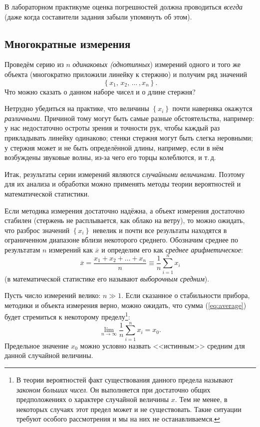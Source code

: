 \documentclass[10pt]{article}
\begin{document}
В лабораторном практикуме оценка погрешностей должна проводиться \emph{всегда}
(даже когда составители задания забыли упомянуть об этом).

\subsection{Многократные измерения}

Проведём серию из $n$ \emph{одинаковых (однотипных}) измерений одного
и того же объекта (многократно приложили линейку к стержню) и получим
ряд значений
\[
\left\{ x_{1},\,x_{2},\,\ldots\,,x_{n}\right\} .
\]
Что можно сказать о данном наборе чисел и о длине стержня?

Нетрудно убедиться на практике, что величины $\left\{ x_{i}\right\} $
почти наверняка окажутся \emph{различными}. Причиной тому могут быть
самые разные обстоятельства, например: у нас недостаточно остроты
зрения и точности рук, чтобы каждый раз прикладывать линейку одинаково;
стенки стержня могут быть слегка неровными; у стержня может и не быть
определённой длины, например, если в нём возбуждены звуковые волны,
из-за чего его торцы колеблются, и т.\,д.

Итак, результаты серии измерений являются \emph{случайными величинами}.
Поэтому для их анализа и обработки можно применять методы теории вероятностей
и математической статистики.

Если методика измерения достаточно надёжна, а объект измерения достаточно
стабилен (стержень не расплывается, как облако на ветру), то можно
ожидать, что разброс значений $\left\{ x_{i}\right\} $ невелик и
почти все результаты находятся в ограниченном диапазоне вблизи некоторого
среднего. Обозначим среднее по результатам $n$ измерений как $\overline{x}$
и определим его как \emph{среднее арифметическое}:
\begin{equation}
\overline{x}=\frac{x_{1}+x_{2}+\ldots+x_{n}}{n}\equiv\frac{1}{n}\sum\limits _{i=1}^{n}x_{i}\label{eq:average}
\end{equation}
(в математической статистике его называют \emph{выборочным средним}).

Пусть число измерений велико: $n\gg1$. Если сказанное о стабильности
прибора, методики и объекта измерения верно, можно ожидать, что сумма
(\ref{eq:average}) будет стремиться к некоторому пределу\footnote{В теории вероятностей факт существования данного предела называют
\emph{законом больших чисел}. Он выполняется при достаточно общих
предположениях о характере случайной величины $x$. Тем не менее,
в некоторых случаях этот предел может и не существовать. Такие ситуации
требуют особого рассмотрения и мы на них не останавливаемся.}:
\[
\lim_{n\to\infty}\frac{1}{n}\sum_{i=1}^{n}x_{i}=x_{0}.
\]
Предельное значение $x_{0}$ можно условно назвать <<истинным>>
средним для данной случайной величины.
\end{document}
